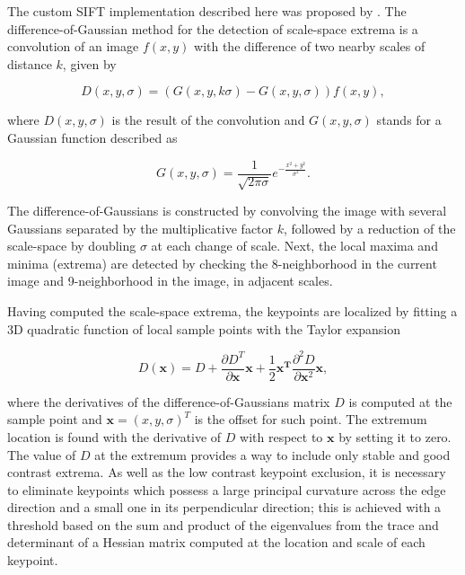 The custom SIFT implementation described here was proposed by . The difference-of-Gaussian method for the detection of scale-space extrema is a convolution of an image $f(x,y)$ with the difference of two nearby scales of distance $k$, given by

\begin{equation}
\label{eqn:DoG}
D(x,y,\sigma) = \left(G(x,y,k \sigma) - G(x,y,\sigma)\right) f(x,y),
\end{equation}

\noindent where $D(x,y,\sigma)$ is the result of the convolution and $G(x,y,\sigma)$ stands for a Gaussian function described as

\begin{equation}
\label{eqn:gaussian_function}
G(x,y,\sigma) = \frac{1}{\sqrt{2 \pi \sigma}} e^{- \frac{x^{2} + y^{2}}{\sigma^{2}}}.
\end{equation}

The difference-of-Gaussians is constructed by convolving the image with several Gaussians separated by the multiplicative factor $k$, followed by a reduction of the scale-space by doubling $\sigma$ at each change of scale. Next, the local maxima and minima (extrema) are detected by checking the 8-neighborhood in the current image and 9-neighborhood in the image, in adjacent scales.

Having computed the scale-space extrema, the keypoints are localized by fitting a 3D quadratic function of local sample points with the Taylor expansion

\begin{equation}
\label{eqn:taylor_DoG}
D(\mathbf{x}) = D + 
                \frac{\partial D^{T}}{\partial  \mathbf{x}}\mathbf{x} + \frac{1}{2}\mathbf{x^{T}}\frac{\partial^{2} D}{\partial \mathbf{x}^{2}}\mathbf{x},
\end{equation}

\noindent where the derivatives of the difference-of-Gaussians matrix $D$ is computed at the sample point and $\mathbf{x} = (x,y,\sigma)^{T}$ is the offset for such point. The extremum location is found with the derivative of $D$ with respect to $\mathbf{x}$ by setting it to zero. The value of $D$ at the extremum provides a way to include only stable and good contrast extrema. As well as the low contrast keypoint exclusion, it is necessary to eliminate keypoints which possess a large principal curvature across the edge direction and a small one in its perpendicular direction; this is achieved with a threshold based on the sum and product of the eigenvalues from the trace and determinant of a Hessian matrix computed at the location and scale of each keypoint.

